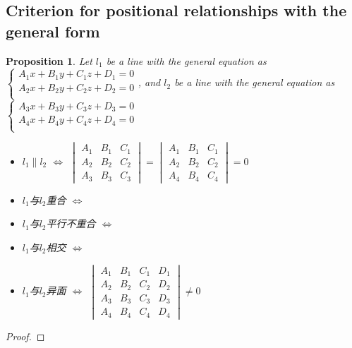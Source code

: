 \documentclass[onecolumn]{ctexart}
\newtheorem{proposition}{Proposition}
\begin{document}
\subsection{Criterion for positional relationships with the general form}
\begin{proposition}
  Let $l_1$ be a line with the general equation as $
  \begin{cases}
    A_1 x + B_1 y + C_1 z + D_1 = 0 \\
    A_2 x + B_2 y + C_2 z + D_2 = 0 \\
  \end{cases}$, and $l_2$ be a line with the general equation as $
  \begin{cases}
    A_3 x + B_3 y + C_3 z + D_3 = 0 \\
    A_4 x + B_4 y + C_4 z + D_4 = 0 \\   
  \end{cases}$
  \begin{itemize}
    \item $l_1 \parallel l_2$ $\Leftrightarrow$ $
    \begin{vmatrix}
      A_1 & B_1 & C_1 \\
      A_2 & B_2 & C_2 \\
      A_3 & B_3 & C_3 
    \end{vmatrix} = 
    \begin{vmatrix}
      A_1 & B_1 & C_1 \\
      A_2 & B_2 & C_2 \\
      A_4 & B_4 & C_4  
    \end{vmatrix} = 0$
    \item $l_1$与$l_2$重合 $\Leftrightarrow$ 
    \item $l_1$与$l_2$平行不重合 $\Leftrightarrow$ 
    \item $l_1$与$l_2$相交 $\Leftrightarrow$
    \item $l_1$与$l_2$异面 $\Leftrightarrow$ $
    \begin{vmatrix}
      A_1 & B_1 & C_1 & D_1 \\
      A_2 & B_2 & C_2 & D_2 \\
      A_3 & B_3 & C_3 & D_3 \\
      A_4 & B_4 & C_4 & D_4
    \end{vmatrix} \neq 0$
  \end{itemize}
\end{proposition}
\begin{proof}
  
\end{proof}
\end{document}
